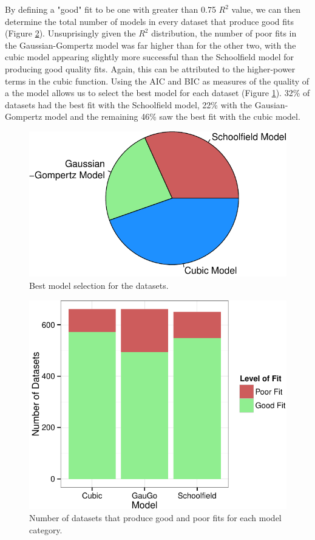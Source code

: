 \documentclass[11pt]{article}
\begin{document}
By defining a "good" fit to be one with greater than 0.75 \(R^2\) value, we can then determine the total number of models in every dataset that produce good fits (Figure \ref{fig:bar}). Unsuprisingly given the \(R^2\) distribution, the number of poor fits in the Gaussian-Gompertz model was far higher than for the other two, with the cubic model appearing slightly more successful than the Schoolfield model for producing good quality fits. Again, this can be attributed to the higher-power terms in the cubic function. Using the AIC and BIC as measures of the quality of a the model allows us to select the best model for each dataset (Figure \ref{fig:pie}). 32\% of datasets had the best fit with the Schoolfield model, 22\% with the Gausian-Gompertz model and the remaining 46\% saw the best fit with the cubic model.

\begin{figure}[h]
\begin{center}
\includegraphics[scale = 1]{pie.pdf}
\caption{Best model selection for the datasets.}
\label{fig:pie}
\end{center}
\end{figure}

\begin{figure}[h]
\begin{center}
\includegraphics[scale = 1]{bar.pdf}
\caption{Number of datasets that produce good and poor fits for each model category.}
\label{fig:bar}
\end{center}
\end{figure}
\end{document}
